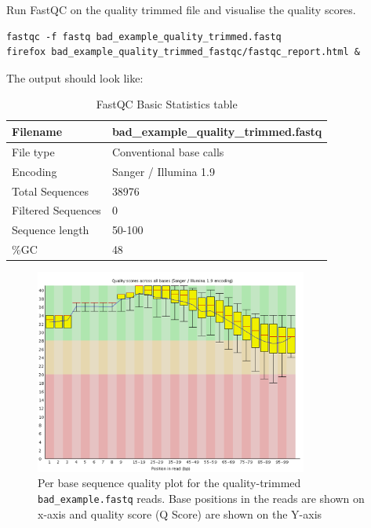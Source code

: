 \begin{steps}
Run FastQC on the quality trimmed file and visualise the quality scores.

\begin{lstlisting}
fastqc -f fastq bad_example_quality_trimmed.fastq
firefox bad_example_quality_trimmed_fastqc/fastqc_report.html &
\end{lstlisting}

The output should look like:

\begin{table}[H]
  \centering
  \caption{FastQC Basic Statistics table}
    \begin{tabular}{ll}
    \toprule
    Filename & bad\_example\_quality\_trimmed.fastq\\
    \midrule
    File type & Conventional base calls\\
    Encoding & Sanger / Illumina 1.9\\
    Total Sequences & 38976\\
    Filtered Sequences & 0\\
    Sequence length & 50-100\\
    \%GC & 48\\
    \bottomrule
    \end{tabular}%
  \label{tab:badexamplequalitytrimmed}%
\end{table}%

\begin{figure}[H]
\centering
\includegraphics[width=0.8\textwidth]{ngs-qc/bad_example_quality_trimmed.png}
\caption{Per base sequence quality plot for the quality-trimmed \texttt{bad\_example.fastq} reads. Base positions in the reads are shown on x-axis and quality score (Q Score) are shown on the Y-axis}
\label{fig:bad_example_quality_trimmed_plot}
\end{figure}

\end{steps}

